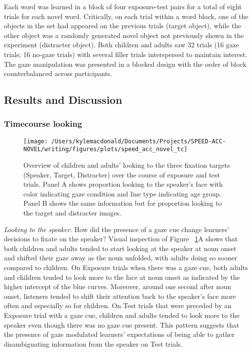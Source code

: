 \documentclass[man,floatsintext]{apa6}
\begin{document}
Each word was learned in a block of four exposure-test pairs for a total
of eight trials for each novel word. Critically, on each trial within a
word block, one of the objects in the set had appeared on the previous
trials (target object), while the other object was a randomly generated
novel object not previously shown in the experiment (distracter object).
Both children and adults saw 32 trials (16 gaze trials; 16 no-gaze
trials) with several filler trials interspersed to maintain interest.
The gaze manipulation was presented in a blocked design with the order
of block counterbalanced across participants.

\subsection{Results and Discussion}\label{results-and-discussion-2}

\subsubsection{Timecourse looking}\label{timecourse-looking}

\begin{figure}[!t]

{\centering \texttt{[image: /Users/kylemacdonald/Documents/Projects/SPEED-ACC-NOVEL/writing/figures/plots/speed\_acc\_novel\_tc]} 

}

\caption{Overview of children and adults' looking to the three fixation targets (Speaker, Target, Distracter) over the course of exposure and test trials. Panel A shows proportion looking to the speaker's face with color indicating gaze condition and line type indicating age group. Panel B shows the same information but for proportion looking to the target and distracter images.}\label{fig:san-tc-plot}
\end{figure}

\emph{Looking to the speaker.} How did the presence of a gaze cue change
learners' decisions to fixate on the speaker? Visual inspection of
Figure ~\ref{fig:san-tc-plot}A shows that both children and adults
tended to start looking at the speaker at noun onset and shifted their
gaze away as the noun unfolded, with adults doing so sooner compared to
children. On Exposure trials when there was a gaze cue, both adults and
children tended to look more to the face at noun onset as indicated by
the higher intercept of the blue curves. Moreover, around one second
after noun onset, listeners tended to shift their attention back to the
speaker's face more often and especially so for children. On Test trials
that were preceded by an Exposure trial with a gaze cue, children and
adults tended to look more to the speaker even though there was no gaze
cue present. This pattern suggests that the presence of gaze modulated
learners' expectations of being able to gather disambiguating
information from the speaker on Test trials.
\end{document}
